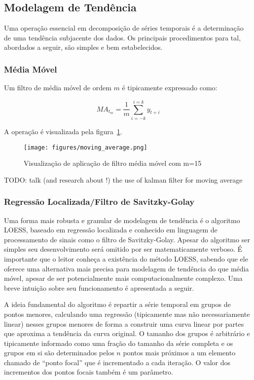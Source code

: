 \subsection{Modelagem de Tendência}

Uma operação essencial em decomposição de séries temporais é a determinação
de uma tendência subjacente dos dados. Os principais procedimentos para tal,
abordados a seguir, são simples e bem estabelecidos.

\subsubsection{Média Móvel}

Um filtro de média móvel de ordem $m$ é tipicamente expressado como:

\begin{equation}\label{eq:ma}
    MA_{t_{m}} = \frac{1}{m} \sum_{i=-k}^{i=k} y_{t+i}
\end{equation}

A operação é visualizada pela figura~\ref{fig:MA}.

\begin{figure}[H]
    \centering
    \texttt{[image: figures/moving\_average.png]}
    \caption{Visualização de aplicação de filtro média móvel com m=15}
    \label{fig:MA}
\end{figure}

TODO: talk (and research about !) the use of kalman filter for moving average

\subsubsection{Regressão Localizada/Filtro de Savitzky-Golay}

Uma forma mais robusta e granular de modelagem de tendência é o algoritmo
LOESS, baseado em regressão localizada e conhecido em linguagem de processamento
de sinais como o filtro de Savitzky-Golay. Apesar do algoritmo ser simples
seu desenvolvimento será omitido por ser matematicamente verboso. É importante
que o leitor conheça a existência do método LOESS, sabendo que ele oferece uma
alternativa mais precisa para modelagem de tendência do que média móvel,
apesar de ser potencialmente mais computacionalmente complexo. Uma breve
intuição sobre seu funcionamento é apresentada a seguir.

A ideia fundamental do algoritmo é repartir a série temporal em grupos de
pontos menores, calculando uma regressão (tipicamente mas não necessariamente
linear) nesses grupos menores de forma a construir uma curva linear por partes
que aproxima a tendência da curva original. O tamanho dos grupos é arbitrário
e tipicamente informado como uma fração do tamanho da série completa e os grupos
em si são determinados pelos $n$ pontos mais próximos a um elemento chamado de
``ponto focal'' que é incrementado a cada iteração. O valor dos incrementos dos
pontos focais também é um parâmetro.

